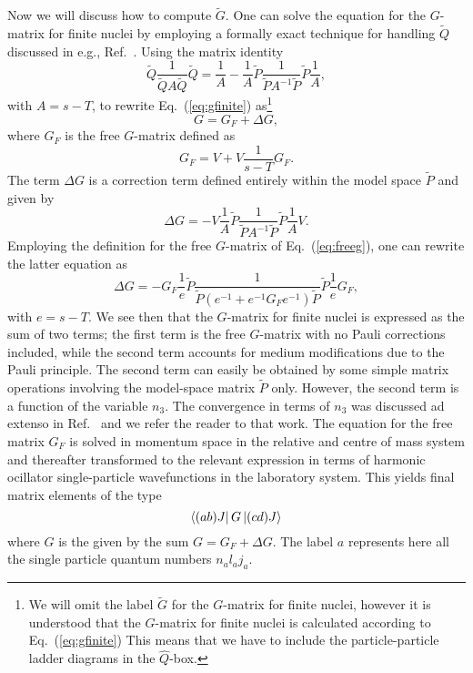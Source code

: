Now we will discuss how to compute $\tilde{G}$. 
One can solve the equation for the $G$-matrix
for finite nuclei by employing
a formally
exact technique for handling $\tilde{Q}$
discussed in e.g., Ref.\ \cite{kkko76}.
Using the matrix identity
\begin{equation}
  \tilde{Q}\frac{1}{\tilde{Q}A\tilde{Q}}
  \tilde{Q}=\frac{1}{A}-
   \frac{1}{A}\tilde{P}\frac{1}{\tilde{P}A^{-1}\tilde{P}}\tilde{P}\frac{1}{A},
   \label{eq:matrix_relation_q}
\end{equation}
with $A=s -T$, to rewrite Eq.\ (\ref{eq:gfinite}) as\footnote{We will omit the
label $\tilde{G}$ for the $G$-matrix for finite nuclei, however it is
understood that the $G$-matrix for finite nuclei is calculated according
to Eq.\ (\ref{eq:gfinite}) This means that we have to 
include the particle-particle ladder diagrams in the 
$\hat{Q}$-box. }
\begin{equation}
   G = G_{F} +\Delta G,\label{eq:gmod}
\end{equation}
where $G_{F}$ is the free $G$-matrix defined as
\begin{equation}
   G_{F}=V+V\frac{1}{s - T}G_{F}. \label{eq:freeg}
\end{equation}
The term $\Delta G$ is a correction term defined entirely within the
model space $\tilde{P}$ and given by
\begin{equation}
   \Delta G =-V\frac{1}{A}\tilde{P}
   \frac{1}{\tilde{P}A^{-1}\tilde{P}}\tilde{P}\frac{1}{A}V.
\end{equation}
Employing the definition for the free $G$-matrix of Eq.\ (\ref{eq:freeg}),
one can rewrite the latter equation as
\begin{equation}
  \Delta G =-G_{F}\frac{1}{e}\tilde{P}
  \frac{1}{\tilde{P}(e^{-1}+e^{-1}G_{F}e^{-1})
  \tilde{P}}\tilde{P}\frac{1}{e}G_F,
\end{equation}
with $e=s -T$.
We see then that the $G$-matrix for finite nuclei
is expressed as the sum of two
terms; the first term is the free $G$-matrix with no Pauli corrections
included, while the second term accounts for medium modifications
due to the Pauli principle. The second term can easily
be obtained by some simple matrix operations involving
the model-space matrix $\tilde{P}$ only.
However, the second term is a function of the variable 
$n_3$. The convergence in terms of $n_3$ was discussed ad extenso
in Ref.\ \cite{hko95} and we refer the reader to that work.
The equation for the free matrix $G_F$ is solved in momentum space in the 
relative and centre of mass system and thereafter transformed to the 
relevant expression in terms of harmonic ocillator single-particle
wavefunctions in the laboratory system. This yields final
matrix elements of the type
\begin{equation}
  \left\langle (ab)J \right|G\left| (cd)J \right\rangle
\end{equation}
where $G$ is the given by the sum $G = G_{F} +\Delta G$.
The label $a$ represents here all the single particle quantum numbers
$n_{a}l_{a}j_{a}$.



